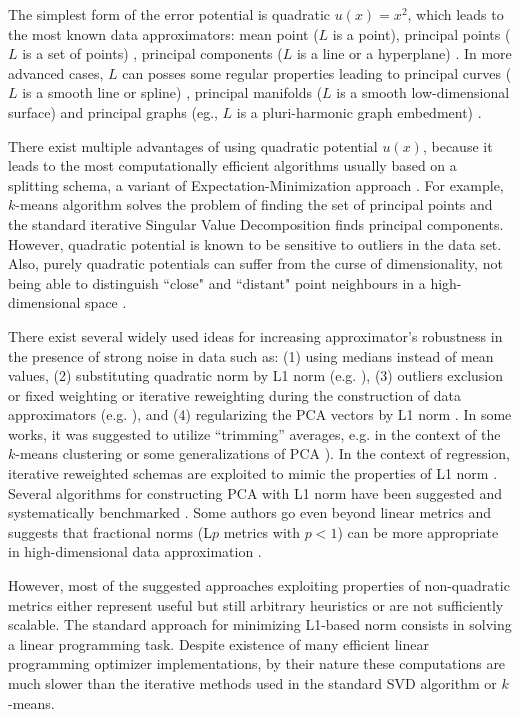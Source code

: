 \documentclass[preprint,12pt,twocolumn]{elsarticle}
\begin{document}
The simplest form of the error potential is quadratic $u(x)=x^2$, which leads to the most known data approximators: mean point ($L$ is a point), principal points ($L$ is a set of points) \cite{Flury1990}, principal components ($L$ is a line or a hyperplane) \cite{Pearson1901On}. In more advanced cases, $L$ can posses some regular properties leading to principal curves ($L$ is a smooth line or spline) \cite{Hastie1984}, principal manifolds ($L$ is a smooth low-dimensional surface) and principal graphs (eg., $L$ is a pluri-harmonic graph embedment) \cite{gorban2007topological,Gorban2009}.

There exist multiple advantages of using quadratic potential $u(x)$, because it leads to the most computationally efficient algorithms usually based on a splitting schema, a variant of Expectation-Minimization approach \cite{Gorban2009}. For example, $k$-means algorithm solves the problem of finding the set of principal points and the standard iterative Singular Value Decomposition finds principal components. However, quadratic potential is known to be sensitive to outliers in the data set. Also, purely quadratic potentials can suffer from the curse of dimensionality, not being able to distinguish ``close" and ``distant" point neighbours in a high-dimensional space \cite{Aggarwal2001}.

There exist several widely used ideas for increasing approximator's robustness in the presence of strong noise in data such as: (1) using medians instead of mean values, (2) substituting quadratic norm by L1 norm (e.g. \cite{Ding2006, hauberg2014}), (3) outliers exclusion or fixed weighting or iterative reweighting during the construction of data approximators (e.g. \cite{Xu1995,Allende2004,kohonen2001self}), and (4) regularizing the PCA vectors by L1 norm \cite{Jolliffe2003,Candes2011,Zou2006}. In some works, it was suggested to utilize ``trimming'' averages, e.g. in the context of the $k$-means clustering or some generalizations of PCA \cite{cuesta1997,hauberg2014}). In the context of regression, iterative reweighted schemas are exploited to mimic the properties of L1 norm \cite{Lu2015}. Several algorithms for constructing PCA with L1 norm have been suggested \cite{Ke2005,Kwak2008,Brooks2013} and systematically benchmarked \cite{brooks2012pcal1,Park2014}. Some authors go even beyond linear metrics and suggests that fractional norms (L$p$ metrics with $p<1$) can be more appropriate in high-dimensional data approximation \cite{Aggarwal2001}.

However, most of the suggested approaches exploiting properties of non-quadratic metrics either represent useful but still arbitrary heuristics or are not sufficiently scalable. The standard approach for minimizing L1-based norm consists in solving a linear programming task. Despite existence of many efficient linear programming optimizer implementations, by their nature these computations are much slower than the iterative methods used in the standard SVD algorithm or $k$-means.
\end{document}
